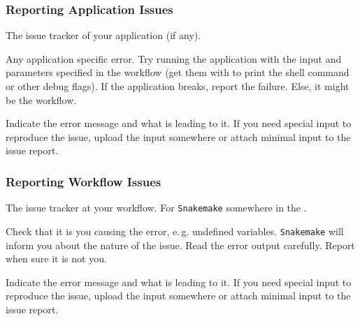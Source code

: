 \begin{frame}
	\frametitle{Reporting Application Issues}
	\begin{question}[Where to?]
		The issue tracker of your application (if any). 
	\end{question}
	\pause
	\begin{question}[What?]
		Any application specific error. Try running the application with the input and parameters specified in the workflow (get them with  to print the shell command or other debug flags). If the application breaks, report the failure. Else, it might be the workflow.
	\end{question}
	\pause
	\begin{question}[How?]
		Indicate the error message and what is leading to it. If you need special input to reproduce the issue, upload the input somewhere or attach minimal input to the issue report.
	\end{question}
\end{frame}

\begin{frame}
	\frametitle{Reporting Workflow Issues}
	\begin{question}[Where to?]
		The issue tracker at your workflow. For \texttt{Snakemake} somewhere in the . 
	\end{question}
	\pause
	\begin{question}[What?]
	   Check that it is you causing the error, e.\,g. undefined variables. \texttt{Snakemake} will inform you about the nature of the issue. Read the error output carefully. Report when sure it is not you.
	\end{question}
	\pause
	\begin{question}[How?]
		Indicate the error message and what is leading to it. If you need special input to reproduce the issue, upload the input somewhere or attach minimal input to the issue report.
	\end{question}
\end{frame}

